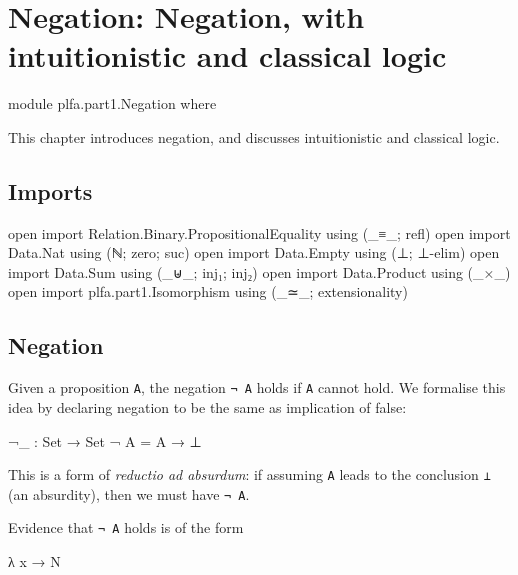 \hypertarget{Negation}{%
\chapter{Negation: Negation, with intuitionistic and classical
logic}\label{Negation}}

\begin{fence}
\begin{code}
module plfa.part1.Negation where
\end{code}
\end{fence}

This chapter introduces negation, and discusses intuitionistic and
classical logic.

\hypertarget{imports}{%
\section{Imports}\label{imports}}

\begin{fence}
\begin{code}
open import Relation.Binary.PropositionalEquality using (_≡_; refl)
open import Data.Nat using (ℕ; zero; suc)
open import Data.Empty using (⊥; ⊥-elim)
open import Data.Sum using (_⊎_; inj₁; inj₂)
open import Data.Product using (_×_)
open import plfa.part1.Isomorphism using (_≃_; extensionality)
\end{code}
\end{fence}

\hypertarget{negation}{%
\section{Negation}\label{negation}}

Given a proposition \texttt{A}, the negation \texttt{¬\ A} holds if
\texttt{A} cannot hold. We formalise this idea by declaring negation to
be the same as implication of false:

\begin{fence}
\begin{code}
¬_ : Set → Set
¬ A = A → ⊥
\end{code}
\end{fence}

This is a form of \emph{reductio ad absurdum}: if assuming \texttt{A}
leads to the conclusion \texttt{⊥} (an absurdity), then we must have
\texttt{¬\ A}.

Evidence that \texttt{¬\ A} holds is of the form

\begin{myDisplay}
λ{ x → N }
\end{myDisplay}

